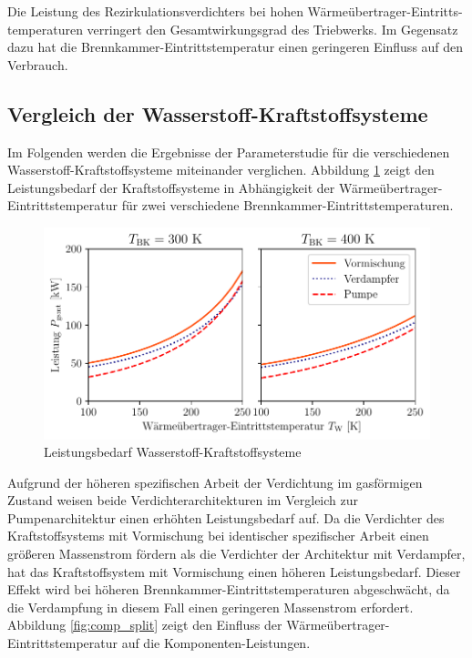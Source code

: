 Die Leistung des Rezirkulationsverdichters bei hohen Wärmeübertrager-Eintritts-temperaturen verringert den Gesamtwirkungsgrad des Triebwerks. Im Gegensatz dazu hat die Brennkammer-Eintrittstemperatur einen geringeren Einfluss auf den Verbrauch.


\subsection{Vergleich der Wasserstoff-Kraftstoffsysteme}

Im Folgenden werden die Ergebnisse der Parameterstudie für die verschiedenen Wasserstoff-Kraftstoffsysteme miteinander verglichen. Abbildung \ref{fig:comp_power} zeigt den Leistungsbedarf der Kraftstoffsysteme in Abhängigkeit der Wärmeübertrager-Eintrittstemperatur für zwei verschiedene Brennkammer-Eintrittstemperaturen.

\begin{figure}[ht]
\centering
\includegraphics[width=0.9\linewidth]{4_Abbildungen/2_Hauptteil/Ergebnisse/summary_power.pdf}
  \caption{Leistungsbedarf Wasserstoff-Kraftstoffsysteme}
  \label{fig:comp_power}
\end{figure}
\FloatBarrier

Aufgrund der höheren spezifischen Arbeit der Verdichtung im gasförmigen Zustand weisen beide Verdichterarchitekturen im Vergleich zur Pumpenarchitektur einen erhöhten Leistungsbedarf auf. Da die Verdichter des Kraftstoffsystems mit Vormischung bei identischer spezifischer Arbeit einen größeren Massenstrom  fördern als die Verdichter der Architektur mit Verdampfer, hat das Kraftstoffsystem mit Vormischung einen höheren Leistungsbedarf. Dieser Effekt wird bei höheren Brennkammer-Eintrittstemperaturen abgeschwächt, da die Verdampfung in diesem Fall einen geringeren Massenstrom erfordert. Abbildung \ref{fig:comp_split} zeigt den Einfluss der Wärmeübertrager-Eintrittstemperatur auf die Komponenten-Leistungen.

